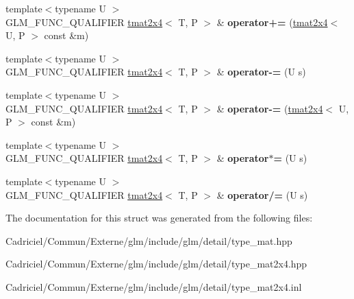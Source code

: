 \begin{DoxyCompactItemize}
\item 
{\footnotesize template$<$typename U $>$ }\\G\+L\+M\+\_\+\+F\+U\+N\+C\+\_\+\+Q\+U\+A\+L\+I\+F\+I\+ER \hyperlink{structglm_1_1detail_1_1tmat2x4}{tmat2x4}$<$ T, P $>$ \& {\bfseries operator+=} (\hyperlink{structglm_1_1detail_1_1tmat2x4}{tmat2x4}$<$ U, P $>$ const \&m)\hypertarget{structglm_1_1detail_1_1tmat2x4_af83887f4894721e8b28d9253fb616700}{}\label{structglm_1_1detail_1_1tmat2x4_af83887f4894721e8b28d9253fb616700}

\item 
{\footnotesize template$<$typename U $>$ }\\G\+L\+M\+\_\+\+F\+U\+N\+C\+\_\+\+Q\+U\+A\+L\+I\+F\+I\+ER \hyperlink{structglm_1_1detail_1_1tmat2x4}{tmat2x4}$<$ T, P $>$ \& {\bfseries operator-\/=} (U s)\hypertarget{structglm_1_1detail_1_1tmat2x4_a0289438555ea967c110a13f4df846953}{}\label{structglm_1_1detail_1_1tmat2x4_a0289438555ea967c110a13f4df846953}

\item 
{\footnotesize template$<$typename U $>$ }\\G\+L\+M\+\_\+\+F\+U\+N\+C\+\_\+\+Q\+U\+A\+L\+I\+F\+I\+ER \hyperlink{structglm_1_1detail_1_1tmat2x4}{tmat2x4}$<$ T, P $>$ \& {\bfseries operator-\/=} (\hyperlink{structglm_1_1detail_1_1tmat2x4}{tmat2x4}$<$ U, P $>$ const \&m)\hypertarget{structglm_1_1detail_1_1tmat2x4_a7f1203e2377c0b0f9e5c1a1bb68006a7}{}\label{structglm_1_1detail_1_1tmat2x4_a7f1203e2377c0b0f9e5c1a1bb68006a7}

\item 
{\footnotesize template$<$typename U $>$ }\\G\+L\+M\+\_\+\+F\+U\+N\+C\+\_\+\+Q\+U\+A\+L\+I\+F\+I\+ER \hyperlink{structglm_1_1detail_1_1tmat2x4}{tmat2x4}$<$ T, P $>$ \& {\bfseries operator$\ast$=} (U s)\hypertarget{structglm_1_1detail_1_1tmat2x4_a3d1fb988d316f24267ca8349b5627be8}{}\label{structglm_1_1detail_1_1tmat2x4_a3d1fb988d316f24267ca8349b5627be8}

\item 
{\footnotesize template$<$typename U $>$ }\\G\+L\+M\+\_\+\+F\+U\+N\+C\+\_\+\+Q\+U\+A\+L\+I\+F\+I\+ER \hyperlink{structglm_1_1detail_1_1tmat2x4}{tmat2x4}$<$ T, P $>$ \& {\bfseries operator/=} (U s)\hypertarget{structglm_1_1detail_1_1tmat2x4_a84f40f6dabc1767c21dd5440f038a363}{}\label{structglm_1_1detail_1_1tmat2x4_a84f40f6dabc1767c21dd5440f038a363}

\end{DoxyCompactItemize}


The documentation for this struct was generated from the following files\+:\begin{DoxyCompactItemize}
\item 
Cadriciel/\+Commun/\+Externe/glm/include/glm/detail/type\+\_\+mat.\+hpp\item 
Cadriciel/\+Commun/\+Externe/glm/include/glm/detail/type\+\_\+mat2x4.\+hpp\item 
Cadriciel/\+Commun/\+Externe/glm/include/glm/detail/type\+\_\+mat2x4.\+inl\end{DoxyCompactItemize}
